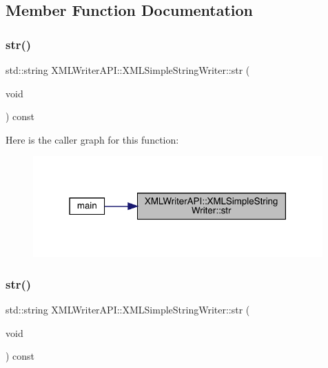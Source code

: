 \subsection{Member Function Documentation}
\mbox{\label{classXMLWriterAPI_1_1XMLSimpleStringWriter_ae316d9565925e9605c38eb0a14e99e90}} 
\subsubsection{\texorpdfstring{str()}{str()}\hspace{0.1cm}{\footnotesize\ttfamily [1/3]}}
{\footnotesize\ttfamily std\+::string X\+M\+L\+Writer\+A\+P\+I\+::\+X\+M\+L\+Simple\+String\+Writer\+::str (\begin{DoxyParamCaption}\item[{void}]{ }\end{DoxyParamCaption}) const\hspace{0.3cm}{\ttfamily [inline]}}

Here is the caller graph for this function\+:
\nopagebreak
\begin{figure}[H]
\begin{center}
\leavevmode
\includegraphics[width=315pt]{da/dec/classXMLWriterAPI_1_1XMLSimpleStringWriter_ae316d9565925e9605c38eb0a14e99e90_icgraph}
\end{center}
\end{figure}
\mbox{\label{classXMLWriterAPI_1_1XMLSimpleStringWriter_ae316d9565925e9605c38eb0a14e99e90}} 
\subsubsection{\texorpdfstring{str()}{str()}\hspace{0.1cm}{\footnotesize\ttfamily [2/3]}}
{\footnotesize\ttfamily std\+::string X\+M\+L\+Writer\+A\+P\+I\+::\+X\+M\+L\+Simple\+String\+Writer\+::str (\begin{DoxyParamCaption}\item[{void}]{ }\end{DoxyParamCaption}) const\hspace{0.3cm}{\ttfamily [inline]}}

